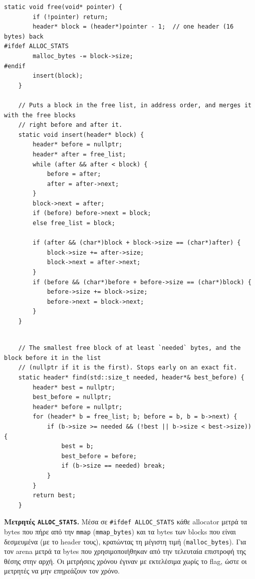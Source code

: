 \documentclass[11pt,a4paper]{article}
\newcommand{\en}[1]{\textlatin{#1}}
\begin{document}
\begin{lstlisting}[caption={First fit allocator: \texttt{malloc}, \texttt{free} και \texttt{insert} με coalescing (\texttt{allocators/first\_fit\_allocator.hpp}).}, label={lst:firstfit}]
    static void free(void* pointer) {
        if (!pointer) return;
        header* block = (header*)pointer - 1;  // one header (16 bytes) back
#ifdef ALLOC_STATS
        malloc_bytes -= block->size;
#endif
        insert(block);
    }

    // Puts a block in the free list, in address order, and merges it with the free blocks
    // right before and after it.
    static void insert(header* block) {
        header* before = nullptr;
        header* after = free_list;
        while (after && after < block) {
            before = after;
            after = after->next;
        }
        block->next = after;
        if (before) before->next = block;
        else free_list = block;

        if (after && (char*)block + block->size == (char*)after) {
            block->size += after->size;
            block->next = after->next;
        }
        if (before && (char*)before + before->size == (char*)block) {
            before->size += block->size;
            before->next = block->next;
        }
    }
\end{lstlisting}

\begin{lstlisting}[caption={Best fit allocator: η αναζήτηση του μικρότερου block που χωρά (\texttt{allocators/best\_fit\_allocator.hpp}), η \texttt{malloc} και η \texttt{free} είναι ίδιες με του first fit.}, label={lst:bestfit}]

    // The smallest free block of at least `needed` bytes, and the block before it in the list
    // (nullptr if it is the first). Stops early on an exact fit.
    static header* find(std::size_t needed, header*& best_before) {
        header* best = nullptr;
        best_before = nullptr;
        header* before = nullptr;
        for (header* b = free_list; b; before = b, b = b->next) {
            if (b->size >= needed && (!best || b->size < best->size)) {
                best = b;
                best_before = before;
                if (b->size == needed) break;
            }
        }
        return best;
    }
\end{lstlisting}

\textbf{Μετρητές \en{\texttt{ALLOC\_STATS}}.} Μέσα σε \en{\texttt{\#ifdef ALLOC\_STATS}} κάθε \en{allocator} μετρά τα \en{bytes} που πήρε από την \en{\texttt{mmap}} (\en{\texttt{mmap\_bytes}}) και τα \en{bytes} των \en{blocks} που είναι δεσμευμένα (με το \en{header} τους), κρατώντας τη μέγιστη τιμή (\en{\texttt{malloc\_bytes}}). Για τον \en{arena} μετρά τα \en{bytes} που χρησιμοποιήθηκαν από την τελευταία επιστροφή της θέσης στην αρχή. Οι μετρήσεις χρόνου έγιναν με εκτελέσιμα χωρίς το \en{flag}, ώστε οι μετρητές να μην επηρεάζουν τον χρόνο.
\end{document}

